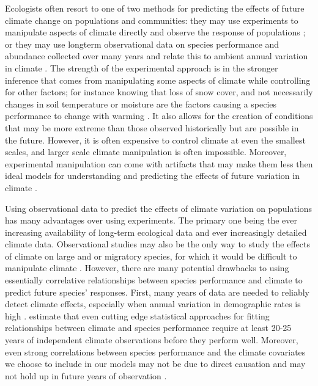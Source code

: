 \documentclass[11pt]{article}
\begin{document}
\begin{doublespacing}
Ecologists often resort to one of two methods for predicting the effects of future climate change on populations and communities: they may use experiments to manipulate aspects of climate directly and observe the response of populations \citep{elmendorf_experiment_2015,knapp_pushing_2016,compagnoni_warming_2014}; or they may use longterm observational data on species performance and abundance collected over many years and relate this to ambient annual variation in climate  \citep{koons_climate_2012,lunn_demography_2016,dalgleish_climate_2010,jenouvrier_demographic_2009}. The strength of the experimental approach is in the stronger inference that comes from manipulating some aspects of climate while controlling for other factors; for instance knowing that loss of snow cover, and not necessarily changes in soil temperature or moisture are the factors causing a species performance to change with warming \citep{compagnoni_warming_2014}. It also allows for the creation of conditions that may be more extreme than those observed historically \cite{knapp_pushing_2016} but are possible in the future. However, it is often expensive to control climate at even the smallest scales, and larger scale climate manipulation is often impossible.  Moreover, experimental manipulation can come with artifacts that may make them less then ideal models for understanding and predicting the effects of future variation in climate \citep{wolkovich_warming_2012}. 

Using observational data to predict the effects of climate variation on populations has many advantages over using experiments. The primary one being the ever increasing availability of long-term ecological data and ever increasingly detailed climate data. Observational studies may also be the only way to study the effects of climate on large and or migratory species, for which it would be difficult to manipulate climate \citep{koons_climate_2012,jenouvrier_demographic_2009,aubry_climate_2013}. However, there are many potential drawbacks to using essentially correlative relationships between species performance and climate to predict future species' responses. First, many years of data are needed to reliably detect climate effects, especially when annual variation in demographic rates is high \citep{teller_linking_2016,gerber_optimal_2015}. \citep{teller_linking_2016} estimate that even cutting edge statistical approaches for fitting relationships between climate and species performance require at least 20-25 years of independent climate observations before they perform well. Moreover, even strong correlations between species performance and the climate covariates we choose to include in our models may not be due to direct causation and may not hold up in future years of observation \citep{hilborn_correlation_2016}. 


\end{doublespacing}
\end{document}
